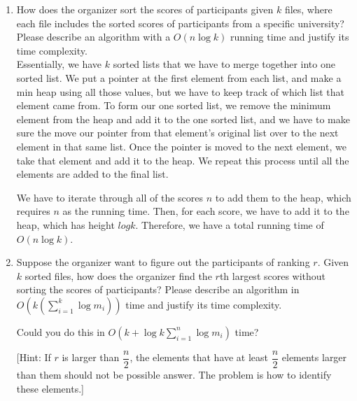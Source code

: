\documentclass{article}
\begin{document}
\begin{enumerate}
\item How does the organizer sort the scores of participants given $k$
  files, where each file includes the sorted scores of participants
  from a specific university?  Please describe an algorithm with a
  $O(n\log k)$ running time and justify its time complexity.\\

Essentially, we have $k$ sorted lists that we have to merge together into one sorted list. We put a pointer at  the first element from each list, and make a min heap using all those values, but we have to keep track of which list that element came from. To form our one sorted list, we remove the minimum element from the heap and add it to the one sorted list, and we have to make sure the move our pointer from that element's original list over to the next element in that same list. Once the pointer is moved to the next element, we take that element and add it to the heap. We repeat this process until all the elements are added to the final list. 

We have to iterate through all of the scores $n$ to add them to the heap, which requires $n$ as the running time. Then, for each score, we have to add it to the heap, which has height $log k$. Therefore, we have a total running time of $O(n\log k)$.

\item Suppose the organizer want to figure out the participants of
  ranking $r$. Given $k$ sorted files, how does the organizer find the
  $r$th largest scores without sorting the scores of participants? Please 
  describe an algorithm in $O(k(\sum_{i=1}^{k}\log m_{i}))$ time and justify
  its time complexity. 

Could you do this in $O(k+\log k \sum_{i=1}^{n}\log m_{i})$ time? 

  [Hint: If $r$ is larger than $\dfrac{n}{2}$, the elements that have at least $\dfrac{n}{2}$ 
  elements larger than them should not be possible answer. The problem is how to identify these
  elements.]\\

\end{enumerate}
\end{document}
